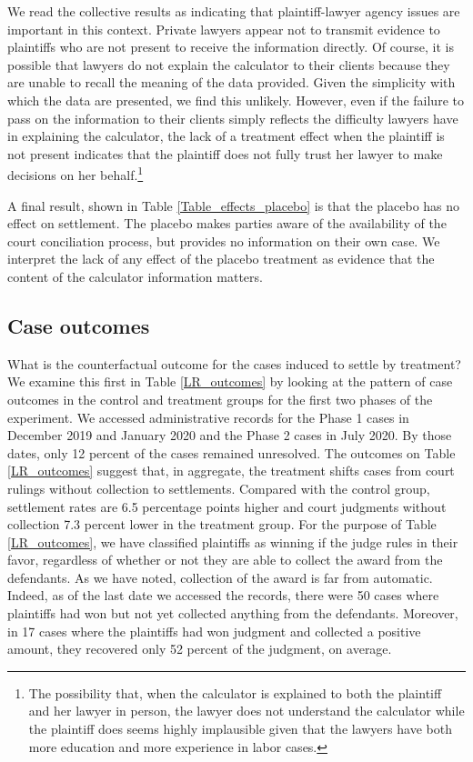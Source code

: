 \documentclass[11pt, a4paper]{article}
\begin{document}
We read the collective results as indicating that plaintiff-lawyer agency issues are important in this context. Private lawyers appear not to transmit evidence to plaintiffs who are not present to receive the information directly. Of course, it is possible that lawyers do not explain the calculator to their clients because they are unable to recall the meaning of the data provided. Given the simplicity with which the data are presented, we find this unlikely. However, even if the failure to pass on the information to their clients simply reflects the difficulty lawyers have in explaining the calculator, the lack of a treatment effect when the plaintiff is not present indicates that the plaintiff does not fully trust her lawyer to make decisions on her behalf.\footnote{The possibility that, when the calculator is explained to both the plaintiff and her lawyer in person, the lawyer does not understand the calculator while the plaintiff does seems highly implausible given that the lawyers have both more education and more experience in labor cases.}


A final result, shown in  Table \ref{Table_effects_placebo} is that the placebo has no effect on settlement. The placebo makes parties aware of the availability of the court conciliation process, but provides no information on their own case. We interpret the lack of any effect of the placebo treatment as evidence that the content of the calculator information matters. 

\subsection{Case outcomes}

 What is the counterfactual outcome for the cases induced to settle by treatment? We examine this first in Table \ref{LR_outcomes} by looking at the pattern of case outcomes in the control and treatment groups for the first two phases of the experiment. We accessed administrative records for the Phase 1 cases in December 2019 and January 2020 and the Phase 2 cases in July 2020. By those dates, only 12 percent of the cases remained unresolved. The outcomes on Table \ref{LR_outcomes} suggest that, in aggregate, the treatment shifts cases from court rulings without collection to settlements. Compared with the control group, settlement rates are 6.5 percentage points higher and court judgments without collection 7.3 percent lower in the treatment group. For the purpose of Table \ref{LR_outcomes}, we have classified plaintiffs as winning if the judge rules in their favor, regardless of whether or not they are able to collect the award from the defendants. As we have noted, collection of the award is far from automatic. Indeed, as of the last date we accessed the records, there were 50 cases where plaintiffs had won but not yet collected anything from the defendants. Moreover, in 17 cases where the plaintiffs had won judgment and collected a positive amount, they recovered only 52 percent of the judgment, on average. %
\end{document}
